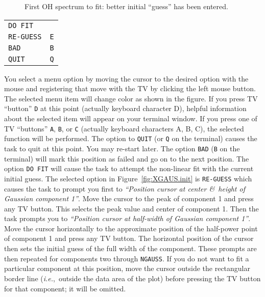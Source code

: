 \documentclass[twoside]{article}
\newcommand{\ie}{{\it i.e.},}
\newcommand{\putfig}[1]{\texttt{[image: \#1.eps]}}
\begin{document}
\begin{figure}
\begin{center}
\resizebox{6.0in}{!}{\putfig{XGAUS.guess}}
\caption{First OH spectrum to fit: better initial ``guess'' has been
  entered.}
\label{fig:XGAUS.guess}
\end{center}
\end{figure}

\begin{center}
\begin{tabular}{|l|l|}\hline
   {\tt DO FIT}   & {\tt \hphantom{A}} \\
   {\tt RE-GUESS} & {\tt E} \\
   {\tt BAD}      & {\tt B} \\
   {\tt QUIT}     & {\tt Q} \\ \hline
\end{tabular}
\end{center}
You select a menu option by moving the cursor to the desired option
with the mouse and registering that move with the TV by clicking the
left mouse button.  The selected menu item will change color as shown
in the figure.  If you press TV ``button'' {\tt D} at this point
(actually keyboard character D), helpful information about the
selected item will appear on your terminal window.  If you press one
of TV ``buttons'' {\tt A}, {\tt B}, or {\tt C} (actually keyboard
characters A, B, C), the selected function will be performed.  The
option to {\tt QUIT} (or {\tt Q} on the terminal) causes the task to
quit at this point.  You may re-start later.  The option {\tt BAD}
({\tt B} on the terminal) will mark this position as failed and go on
to the next position.  The option {\tt DO FIT} will cause the task to
attempt the non-linear fit with the current initial guess.  The
selected option in Figure~\ref{fig:XGAUS.init} is {\tt RE-GUESS} which
causes the task to prompt you first to {\it ``Position cursor at
  center \&\ height of Gaussian component 1''}.  Move the cursor to
the peak of component 1 and press any TV button.  This selects the
peak value and center of component 1.  Then the task prompts you to
{\it ``Position cursor at half-width of Gaussian component 1''}.  Move
the cursor horizontally to the approximate position of the half-power
point of component 1 and press any TV button.  The horizontal position
of the cursor then sets the initial guess of the full width of the
component.  These prompts are then repeated for components two through
{\tt NGAUSS}\@.  If you do not want to fit a particular component at
this position, move the cursor outside the rectangular border line
(\ie\ outside the data area of the plot) before pressing the TV
button for that component; it will be omitted.
\end{document}
